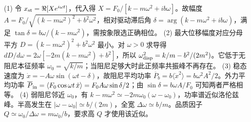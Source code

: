 (1) 令 \(x_{\rm st}=\Re[Xe^{i\omega t}]\)，代入得 \(X=F_0/[k-m\omega^2+ib\omega]\)。故幅度 \(A=F_0/\sqrt{(k-m\omega^2)^2+b^2\omega^2}\)，相对驱动滞后角 \(\delta=\arg(k-m\omega^2+ib\omega)\)，满足 \(\tan\delta=b\omega/(k-m\omega^2)\)，需按象限选正确相位。
(2) 最大位移幅度对应分母平方 \(D=(k-m\omega^2)^2+b^2\omega^2\) 最小。对 \(\omega>0\) 求导得 \(dD/d\omega=2\omega[-2m(k-m\omega^2)+b^2]\)，所以 \(\omega_{\rm disp}^2=k/m-b^2/(2m^2)\)。它低于无阻尼本征频率 \(\omega_0=\sqrt{k/m}\)；当阻尼足够大时此正频率共振峰不再存在。
(3) 稳态速度为 \(\dot x=-A\omega\sin(\omega t-\delta)\)，故阻尼平均功率 \(\overline P_b=b\langle\dot x^2\rangle=b\omega^2A^2/2\)。外力平均功率 \(\overline P_{\rm in}=\langle F_0\cos\omega t\,\dot x\rangle=F_0A\omega\sin\delta/2\)；由 \(\sin\delta=b\omega A/F_0\) 可知两者严格相等。
(4) 弱阻尼邻近 \(\omega_0\)，有 \(k-m\omega^2\simeq-2m\omega_0(\omega-\omega_0)\)，功率谱近似洛伦兹峰。半高发生在 \(|\omega-\omega_0|\simeq b/(2m)\)，全宽 \(\Delta\omega\simeq b/m\)。品质因子 \(Q\simeq\omega_0/\Delta\omega=m\omega_0/b\)，要求高 \(Q\) 才使用该近似。
